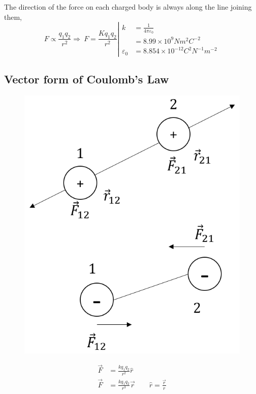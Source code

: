 \documentclass[12pt]{article}
\theoremstyle{definition}
\begin{document}
The direction of the force on each charged body is always along the line joining them,
\[F\propto \frac{q_1 q_2}{r^2}\Rightarrow\ F=\frac{K q_1 q_2}{r^2}\left| \begin{aligned}
    k &= \frac{1}{4\pi\varepsilon_0}\\
    &= 8.99\times10^9 Nm^2C^{-2}\\
    \varepsilon_0 &= 8.854\times10^{-12} C^{2}N^{-1}m^{-2}
\end{aligned}\right.\]
\newpage
\subsection{Vector form of Coulomb's Law}
\begin{figure}[h]
    \centering
    \includegraphics[scale=.5]{2.png}
    \label{fig:couVector}
\end{figure}
\begin{align*}
    \vec{F} &= \frac{kq_1q_2}{r^2}\hat{r}\\
    \vec{F} &= \frac{kq_1q_2}{r^3}\vec{r}\qquad \hat{r}=\frac{\vec{r}}{r}
\end{align*}
\end{document}
